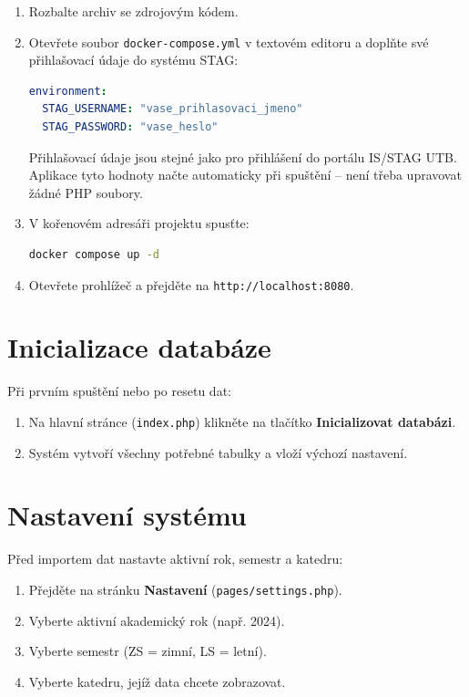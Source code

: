\documentclass[12pt,a4paper]{report}
\begin{document}
\begin{enumerate}
  \item Rozbalte archiv se zdrojovým kódem.
  \item Otevřete soubor \texttt{docker-compose.yml} v textovém editoru a doplňte své přihlašovací údaje do systému STAG:
    \begin{lstlisting}[language=yaml]
environment:
  STAG_USERNAME: "vase_prihlasovaci_jmeno"
  STAG_PASSWORD: "vase_heslo"
    \end{lstlisting}
    Přihlašovací údaje jsou stejné jako pro přihlášení do portálu IS/STAG UTB.
    Aplikace tyto hodnoty načte automaticky při spuštění -- není třeba upravovat žádné PHP soubory.
  \item V kořenovém adresáři projektu spusťte:
    \begin{lstlisting}[language=bash]
docker compose up -d
    \end{lstlisting}
  \item Otevřete prohlížeč a přejděte na \texttt{http://localhost:8080}.
\end{enumerate}

\section{Inicializace databáze}

Při prvním spuštění nebo po resetu dat:
\begin{enumerate}
  \item Na hlavní stránce (\texttt{index.php}) klikněte na tlačítko \textbf{Inicializovat databázi}.
  \item Systém vytvoří všechny potřebné tabulky a vloží výchozí nastavení.
\end{enumerate}

\section{Nastavení systému}

Před importem dat nastavte aktivní rok, semestr a katedru:
\begin{enumerate}
  \item Přejděte na stránku \textbf{Nastavení} (\texttt{pages/settings.php}).
  \item Vyberte aktivní akademický rok (např. 2024).
  \item Vyberte semestr (ZS = zimní, LS = letní).
  \item Vyberte katedru, jejíž data chcete zobrazovat.
\end{enumerate}
\end{document}
